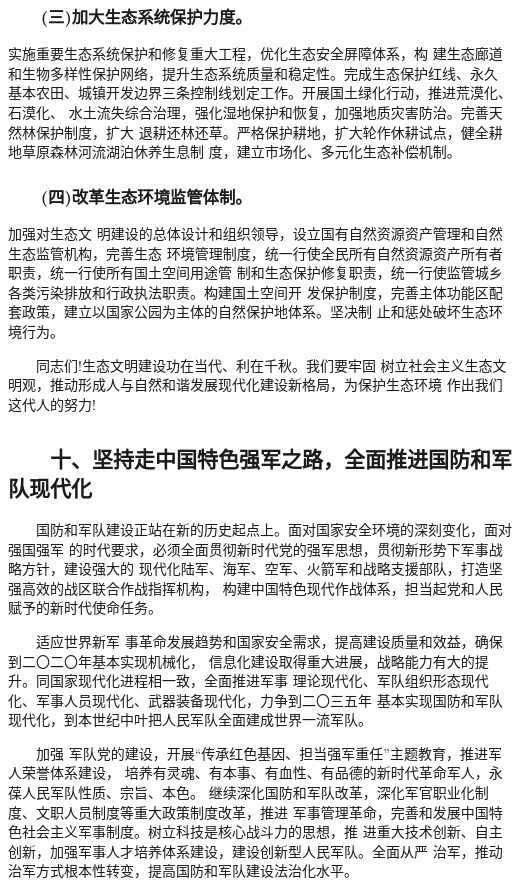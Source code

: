 \documentclass[11pt]{ctexart}
\begin{document}
{{{{\subsubsection{　　(三)加大生态系统保护力度。}
\label{sec:orgdb77b8e}

实施重要生态系统保护和修复重大工程，优化生态安全屏障体系，构
建生态廊道和生物多样性保护网络，提升生态系统质量和稳定性。完成生态保护红线、永久
基本农田、城镇开发边界三条控制线划定工作。开展国土绿化行动，推进荒漠化、石漠化、
水土流失综合治理，强化湿地保护和恢复，加强地质灾害防治。完善天然林保护制度，扩大
退耕还林还草。严格保护耕地，扩大轮作休耕试点，健全耕地草原森林河流湖泊休养生息制
度，建立市场化、多元化生态补偿机制。

\subsubsection{　　(四)改革生态环境监管体制。}
\label{sec:org230f92c}

加强对生态文
明建设的总体设计和组织领导，设立国有自然资源资产管理和自然生态监管机构，完善生态
环境管理制度，统一行使全民所有自然资源资产所有者职责，统一行使所有国土空间用途管
制和生态保护修复职责，统一行使监管城乡各类污染排放和行政执法职责。构建国土空间开
发保护制度，完善主体功能区配套政策，建立以国家公园为主体的自然保护地体系。坚决制
止和惩处破坏生态环境行为。

　　同志们!生态文明建设功在当代、利在千秋。我们要牢固
树立社会主义生态文明观，推动形成人与自然和谐发展现代化建设新格局，为保护生态环境
作出我们这代人的努力!

\subsection{　　十、坚持走中国特色强军之路，全面推进国防和军队现代化}
\label{sec:org701b4e1}
　　国防和军队建设正站在新的历史起点上。面对国家安全环境的深刻变化，面对强国强军
的时代要求，必须全面贯彻新时代党的强军思想，贯彻新形势下军事战略方针，建设强大的
现代化陆军、海军、空军、火箭军和战略支援部队，打造坚强高效的战区联合作战指挥机构，
构建中国特色现代作战体系，担当起党和人民赋予的新时代使命任务。

　　适应世界新军
事革命发展趋势和国家安全需求，提高建设质量和效益，确保到二〇二〇年基本实现机械化，
信息化建设取得重大进展，战略能力有大的提升。同国家现代化进程相一致，全面推进军事
理论现代化、军队组织形态现代化、军事人员现代化、武器装备现代化，力争到二〇三五年
基本实现国防和军队现代化，到本世纪中叶把人民军队全面建成世界一流军队。

　　加强
军队党的建设，开展“传承红色基因、担当强军重任”主题教育，推进军人荣誉体系建设，
培养有灵魂、有本事、有血性、有品德的新时代革命军人，永葆人民军队性质、宗旨、本色。
继续深化国防和军队改革，深化军官职业化制度、文职人员制度等重大政策制度改革，推进
军事管理革命，完善和发展中国特色社会主义军事制度。树立科技是核心战斗力的思想，推
进重大技术创新、自主创新，加强军事人才培养体系建设，建设创新型人民军队。全面从严
治军，推动治军方式根本性转变，提高国防和军队建设法治化水平。

}}}}
\end{document}
